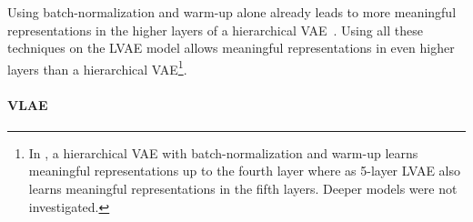 Using batch-normalization and warm-up alone already leads to more meaningful representations in the higher layers of a hierarchical VAE~\citep{sonderby2016ladder}.
Using all these techniques on the \ac{LVAE} model allows meaningful representations in even higher layers than a hierarchical VAE\footnote{In \citet{sonderby2016ladder}, a hierarchical \ac{VAE} with batch-normalization and warm-up learns meaningful representations up to the fourth layer where as 5-layer \ac{LVAE} also learns meaningful representations in the fifth layers. Deeper models were not investigated.}.

\paragraph{\acl{VLAE}}

\begin{figure}
    \centering
    \begin{subfigure}{.45\textwidth}
        \centering

\end{subfigure}
\end{figure}
